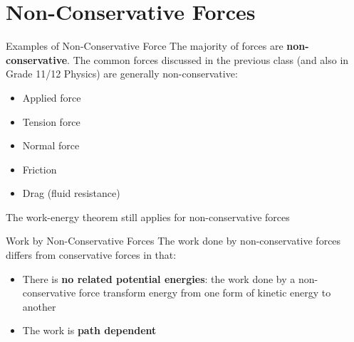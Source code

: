 \documentclass[12pt,compress,aspectratio=169]{beamer}
\begin{document}
\section{Non-Conservative Forces}

\begin{frame}{Examples of Non-Conservative Force}
  The majority of forces are \textbf{non-conservative}. The common forces
  discussed in the previous class (and also in Grade 11/12 Physics) are
  generally non-conservative:
  \begin{itemize}
  \item Applied force
  \item Tension force
  \item Normal force
  \item Friction%
  \item Drag (fluid resistance)
  \end{itemize}
  The work-energy theorem still applies for non-conservative forces
\end{frame}



\begin{frame}{Work by Non-Conservative Forces}
  The work done by non-conservative forces differs from conservative forces in
  that:
  \begin{itemize}
  \item There is \textbf{no related potential energies}: the work done by a
    non-conservative force transform energy from one form of kinetic energy to
    another
  \item The work is \textbf{path dependent}
  \end{itemize}
\end{frame}
\end{document}
